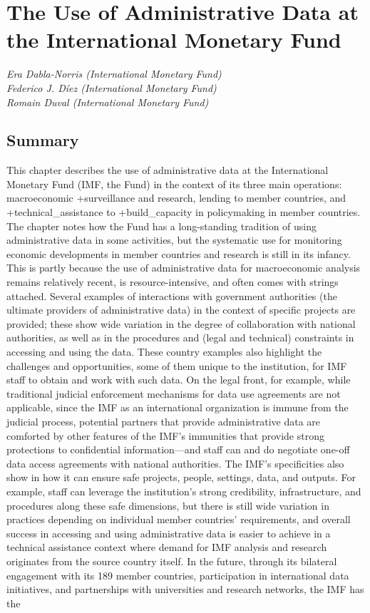 \documentclass[
]{book}
\begin{document}
\hypertarget{imf}{%
\chapter{The Use of Administrative Data at the International Monetary Fund}\label{imf}}

\emph{Era Dabla-Norris (International Monetary Fund)}\\
\emph{Federico J. Díez (International Monetary Fund)}\\
\emph{Romain Duval (International Monetary Fund)}

\hypertarget{summary-9}{%
\section{Summary}\label{summary-9}}

This chapter describes the use of administrative data at the International Monetary Fund (IMF, the Fund) in the context of its three main operations: macroeconomic +surveillance\textbar{} and research, lending to member countries, and +technical\_assistance\textbar{} to +build\_capacity\textbar{} in policymaking in member countries. The chapter notes how the Fund has a long-standing tradition of using administrative data in some activities, but the systematic use for monitoring economic developments in member countries and research is still in its infancy. This is partly because the use of administrative data for macroeconomic analysis remains relatively recent, is resource-intensive, and often comes with strings attached. Several examples of interactions with government authorities (the ultimate providers of administrative data) in the context of specific projects are provided; these show wide variation in the degree of collaboration with national authorities, as well as in the procedures and (legal and technical) constraints in accessing and using the data. These country examples also highlight the challenges and opportunities, some of them unique to the institution, for IMF staff to obtain and work with such data. On the legal front, for example, while traditional judicial enforcement mechanisms for data use agreements are not applicable, since the IMF as an international organization is immune from the judicial process, potential partners that provide administrative data are comforted by other features of the IMF's immunities that provide strong protections to confidential information---and staff can and do negotiate one-off data access agreements with national authorities. The IMF's specificities also show in how it can ensure safe projects, people, settings, data, and outputs. For example, staff can leverage the institution's strong credibility, infrastructure, and procedures along these safe dimensions, but there is still wide variation in practices depending on individual member countries' requirements, and overall success in accessing and using administrative data is easier to achieve in a technical assistance context where demand for IMF analysis and research originates from the source country itself. In the future, through its bilateral engagement with its 189 member countries, participation in international data initiatives, and partnerships with universities and research networks, the IMF has the 
\end{document}
